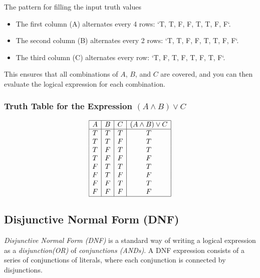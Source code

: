 The pattern for filling the input truth values

\begin{itemize}

	\item The first column (A) alternates every 4 rows: `T, T, F, F, T, T, F, F`.

	\item The second column (B) alternates every 2 rows: `T, T, F, F, T, T, F, F`.

	\item The third column (C) alternates every row: `T, F, T, F, T, F, T, F`.

\end{itemize}

This ensures that all combinations of \(A\), \(B\), and \(C\) are covered, and you 
can then evaluate the logical expression for each combination.

\subsubsection{Truth Table for the Expression \texorpdfstring{\( (A \land B) \lor C \)}{}}

\[
	\begin{array}{|c|c|c|c|}
		\hline
		A & B & C & (A \land B) \lor C \\
		\hline
		T & T & T & T                  \\
		T & T & F & T                  \\
		T & F & T & T                  \\
		T & F & F & F                  \\
		F & T & T & T                  \\
		F & T & F & F                  \\
		F & F & T & T                  \\
		F & F & F & F                  \\
		\hline
	\end{array}
\]

\subsection{Disjunctive Normal Form (DNF)}

\emph{Disjunctive Normal Form (DNF)} is a standard way of writing a logical expression as a 
\emph{disjunction(OR)} of \emph{conjunctions (ANDs)}. A DNF expression consists of a series of
conjunctions of literals, where each conjunction is connected by disjunctions.

